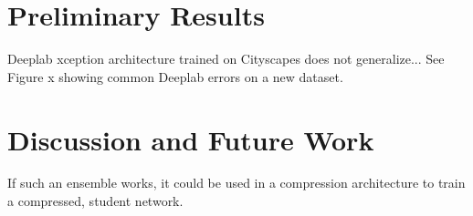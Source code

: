 \documentclass[10pt,twocolumn,letterpaper]{article}
\begin{document}
\section{Preliminary Results}
Deeplab xception architecture trained on Cityscapes does not generalize... See Figure x showing common Deeplab errors on a new dataset.

\section{Discussion and Future Work}

If such an ensemble works, it could be used in a compression architecture to train a compressed, student network.
{\small
%


}
\end{document}
